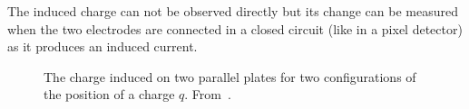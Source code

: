 The induced charge can not be observed directly but its change can be
measured when the two electrodes are connected in a closed circuit
(like in a pixel detector) as it produces an induced current.

\begin{figure}[htbp]
  \centering
  \caption{The charge induced on two parallel plates for two
    configurations of the position of a charge
    $q$. From~\cite{Spieler2005}.}
  \label{fig:InducedCharge_parallelPlates}
\end{figure}

